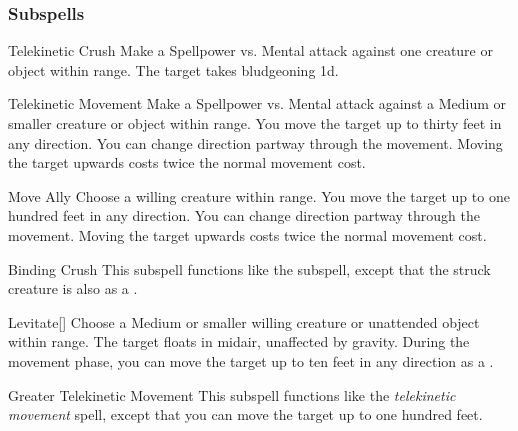 \subsubsection{Subspells}


\begin{ability}[\nth{1}]{Telekinetic Crush}
Make a Spellpower vs. Mental attack against one creature or object within \rngmed range.
\hit The target takes bludgeoning  \plus1d.
\end{ability}
\vspace{0.25em}


\begin{ability}[\nth{1}]{Telekinetic Movement}
Make a Spellpower vs. Mental attack against a Medium or smaller creature or object within \rngmed range.
\hit You move the target up to thirty feet in any direction.
You can change direction partway through the movement.
Moving the target upwards costs twice the normal movement cost.
\end{ability}
\vspace{0.25em}


\begin{ability}[\nth{2}]{Move Ally}
Choose a willing creature within \rngmed range.
You move the target up to one hundred feet in any direction.
You can change direction partway through the movement.
Moving the target upwards costs twice the normal movement cost.
\end{ability}
\vspace{0.25em}


\begin{ability}[\nth{3}]{Binding Crush}
This subspell functions like the  subspell, except that the struck creature is also  as a .
\end{ability}
\vspace{0.25em}


\begin{ability}[\nth{3}]{Levitate}[]
Choose a Medium or smaller willing creature or unattended object within \rngclose range.
The target floats in midair, unaffected by gravity.
During the movement phase, you can move the target up to ten feet in any direction as a .
\end{ability}
\vspace{0.25em}


\begin{ability}[\nth{4}]{Greater Telekinetic Movement}
This subspell functions like the \textit{telekinetic movement} spell, except that you can move the target up to one hundred feet.
\end{ability}
\vspace{0.25em}


